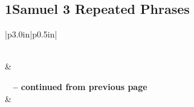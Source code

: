 \subsection{1Samuel 3 Repeated Phrases}


\normalsize
 
\begin{center}
\begin{longtable}{|p{3.0in}|p{0.5in}|}
\caption[1Samuel 3 Repeated Phrases]{1Samuel 3 Repeated Phrases}\label{table:Repeated Phrases 1Samuel 3} \\
\hline {} &  \\ \hline 
\endfirsthead
 
{{\bfseries \tablename\ \thetable{} -- continued from previous page}} \\  
\hline {} &  \\ \hline 
\endhead
 

\end{longtable}
\end{center}
